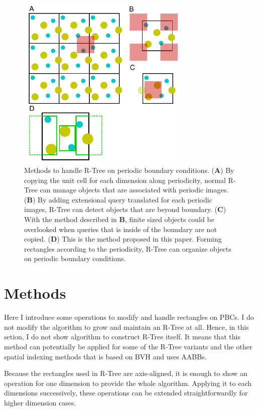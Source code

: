 \documentclass[10pt,letterpaper,twocolumn]{article}
\begin{document}
\begin{figure}[hbt]
    \includegraphics[width=8.4cm, bb=6 3 220 224]{fig1.eps}
    \caption{Methods to handle R-Tree on periodic boundary conditions.
    (\textbf{A})
    By copying the unit cell for each dimension along periodicity, normal R-Tree
    can manage objects that are associated with periodic images.
    (\textbf{B})
    By adding extensional query translated for each periodic images, R-Tree can
    detect objects that are beyond boundary.
    (\textbf{C})
    With the method described in \textbf{B}, finite sized objects could be
    overlooked when queries that is inside of the boundary are not copied.
    (\textbf{D})
    This is the method proposed in this paper. Forming rectangles according to
    the periodicity, R-Tree can organize objects on periodic boundary
    conditions.}
    \label{fig-method-rtree-pbc}
\end{figure}

\section*{Methods}

Here I introduce some operations to modify and handle rectangles on PBCs.
I do not modify the algorithm to grow and maintain an R-Tree at all.
Hence, in this setion, I do not show algorithm to construct R-Tree itself.
It means that this method can potentially be applied for some of the R-Tree
variants and the other spatial indexing methods that is based on BVH and
uses AABBs.

Because the rectangles used in R-Tree are axis-aligned, it is enough to show an
operation for one dimension to provide the whole algorithm.
Applying it to each dimensions successively, these operations can be extended
straightforwardly for higher dimension cases.
\end{document}
